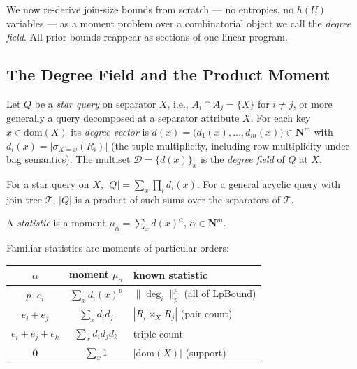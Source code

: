 We now re-derive join-size bounds from scratch --- no entropies, no
$h(U)$ variables --- as a moment problem over a combinatorial object
we call the \emph{degree field}.  All prior bounds reappear as
sections of one linear program.

\subsection{The Degree Field and the Product Moment}

\begin{definition}
\label{def:field}
Let $Q$ be a \emph{star query} on separator $X$, i.e., $A_i \cap A_j =
\{X\}$ for $i\neq j$, or more generally a query decomposed at a
separator attribute $X$.  For each key $x \in \mathrm{dom}(X)$ its
\emph{degree vector} is
$d(x) = \big(d_1(x),\dots,d_m(x)\big) \in \mathbf{N}^m$ with
$d_i(x) = \big|\sigma_{X=x}(R_i)\big|$
(the tuple multiplicity, including row multiplicity under bag
semantics).  The multiset $\mathcal{D} = \{d(x)\}_x$ is the
\emph{degree field} of $Q$ at $X$.
\end{definition}

\begin{proposition}
\label{prop:prod}
For a star query on $X$, $|Q| = \sum_x \prod_i d_i(x)$.  For a general
acyclic query with join tree $\mathcal{T}$, $|Q|$ is a product of such
sums over the separators of $\mathcal{T}$.
\end{proposition}

\begin{definition}
A \emph{statistic} is a moment
$\mu_\alpha = \sum_x d(x)^\alpha$, $\alpha \in \mathbf{N}^m$.
\end{definition}

\noindent Familiar statistics are moments of particular orders:

\begin{center}\small
\begin{tabular}{c|c|l}
$\alpha$ & moment $\mu_\alpha$ & known statistic \\ \hline
$p\cdot e_i$ & $\sum_x d_i(x)^p$ & $\|\deg_i\|_p^p$ \;(all of LpBound) \\
$e_i{+}e_j$ & $\sum_x d_i d_j$ & $|R_i \Join_X R_j|$ \;(pair count) \\
$e_i{+}e_j{+}e_k$ & $\sum_x d_i d_j d_k$ & triple count \\
$\mathbf{0}$ & $\sum_x 1$ & $|\mathrm{dom}(X)|$ \;(support) \\
\end{tabular}
\end{center}

